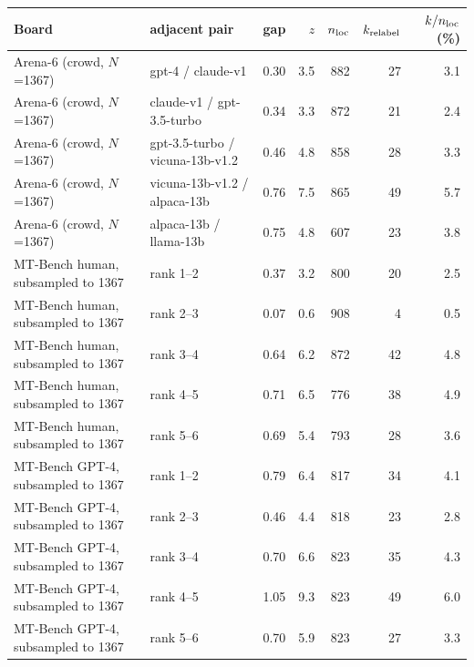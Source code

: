 \begin{tabular}{llrrrrr}\toprule
 Board & adjacent pair & gap & $z$ & $n_{\rm loc}$ & $k_{\rm relabel}$ & $k/n_{\rm loc}$ (\%) \\\midrule
Arena-6 (crowd, $N$=1367) & gpt-4 / claude-v1 & 0.30 & 3.5 & 882 & 27 & 3.1 \\
Arena-6 (crowd, $N$=1367) & claude-v1 / gpt-3.5-turbo & 0.34 & 3.3 & 872 & 21 & 2.4 \\
Arena-6 (crowd, $N$=1367) & gpt-3.5-turbo / vicuna-13b-v1.2 & 0.46 & 4.8 & 858 & 28 & 3.3 \\
Arena-6 (crowd, $N$=1367) & vicuna-13b-v1.2 / alpaca-13b & 0.76 & 7.5 & 865 & 49 & 5.7 \\
Arena-6 (crowd, $N$=1367) & alpaca-13b / llama-13b & 0.75 & 4.8 & 607 & 23 & 3.8 \\
\midrule
MT-Bench human, subsampled to 1367 & rank 1--2 & 0.37 & 3.2 & 800 & 20 & 2.5 \\
MT-Bench human, subsampled to 1367 & rank 2--3 & 0.07 & 0.6 & 908 & 4 & 0.5 \\
MT-Bench human, subsampled to 1367 & rank 3--4 & 0.64 & 6.2 & 872 & 42 & 4.8 \\
MT-Bench human, subsampled to 1367 & rank 4--5 & 0.71 & 6.5 & 776 & 38 & 4.9 \\
MT-Bench human, subsampled to 1367 & rank 5--6 & 0.69 & 5.4 & 793 & 28 & 3.6 \\
\midrule
MT-Bench GPT-4, subsampled to 1367 & rank 1--2 & 0.79 & 6.4 & 817 & 34 & 4.1 \\
MT-Bench GPT-4, subsampled to 1367 & rank 2--3 & 0.46 & 4.4 & 818 & 23 & 2.8 \\
MT-Bench GPT-4, subsampled to 1367 & rank 3--4 & 0.70 & 6.6 & 823 & 35 & 4.3 \\
MT-Bench GPT-4, subsampled to 1367 & rank 4--5 & 1.05 & 9.3 & 823 & 49 & 6.0 \\
MT-Bench GPT-4, subsampled to 1367 & rank 5--6 & 0.70 & 5.9 & 823 & 27 & 3.3 \\
\bottomrule\end{tabular}
